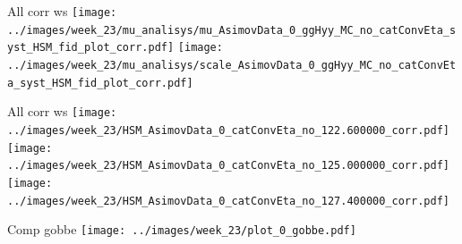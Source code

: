\documentclass[10pt,UKenglish, leqno, xcolor = dvipsnames]{beamer}
\begin{document}
		\begin{frame}{All corr ws}
			\vfill
			\centering
			\texttt{[image: ../images/week\_23/mu\_analisys/mu\_AsimovData\_0\_ggHyy\_MC\_no\_catConvEta\_syst\_HSM\_fid\_plot\_corr.pdf]}
			\texttt{[image: ../images/week\_23/mu\_analisys/scale\_AsimovData\_0\_ggHyy\_MC\_no\_catConvEta\_syst\_HSM\_fid\_plot\_corr.pdf]}
			\vfill
		\end{frame}
		
		\begin{frame}{All corr ws}
			\vfill
			\centering
			\texttt{[image: ../images/week\_23/HSM\_AsimovData\_0\_catConvEta\_no\_122.600000\_corr.pdf]}
			\texttt{[image: ../images/week\_23/HSM\_AsimovData\_0\_catConvEta\_no\_125.000000\_corr.pdf]}
			\texttt{[image: ../images/week\_23/HSM\_AsimovData\_0\_catConvEta\_no\_127.400000\_corr.pdf]}
			\vfill
		\end{frame}
	
		\begin{frame}{Comp gobbe}
			\vfill
			\centering
			\texttt{[image: ../images/week\_23/plot\_0\_gobbe.pdf]}
			
			\vfill
		\end{frame}
		
\end{document}
